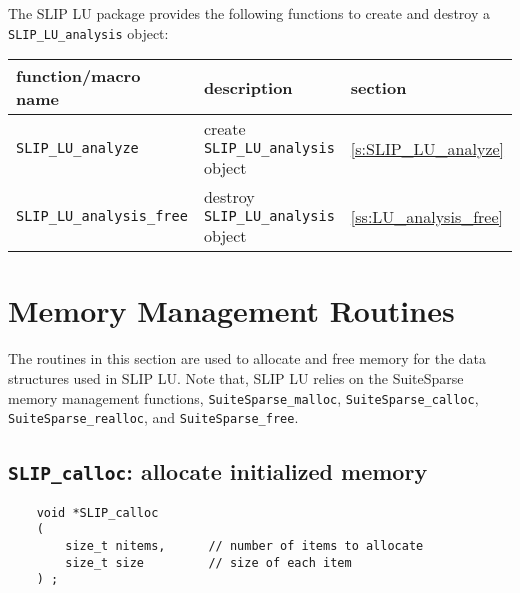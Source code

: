 \documentclass[12pt]{article}
\theoremstyle{definition}
\begin{document}
The SLIP LU package provides the following functions to create and destroy a
\verb|SLIP_LU_analysis| object:

{\small
\begin{center}
\begin{tabular}{lll}
\hline
function/macro name & description & section \\
\hline
\verb|SLIP_LU_analyze|
    & create \verb|SLIP_LU_analysis| object
    & \ref{s:SLIP_LU_analyze} \\
\hline
\verb|SLIP_LU_analysis_free|
    & destroy \verb|SLIP_LU_analysis| object
    & \ref{ss:LU_analysis_free} \\
\hline
\end{tabular}
\end{center}
}

\section{Memory Management Routines} \label{s:user:memmanag}

The routines in this section are used to allocate and free memory for the data
structures used in SLIP LU.
Note that, SLIP LU relies on the SuiteSparse memory management functions,
\verb|SuiteSparse_malloc|, \verb|SuiteSparse_calloc|,
\verb|SuiteSparse_realloc|, and \verb|SuiteSparse_free|.


\cprotect\subsection{\verb|SLIP_calloc|: allocate initialized memory}
\label{ss:SLIP_calloc}

\begin{mdframed}[userdefinedwidth=6in]
{\footnotesize
\begin{verbatim}
    void *SLIP_calloc 
    ( 
        size_t nitems,      // number of items to allocate 
        size_t size         // size of each item 
    ) ;
\end{verbatim}
} \end{mdframed}
\end{document}

